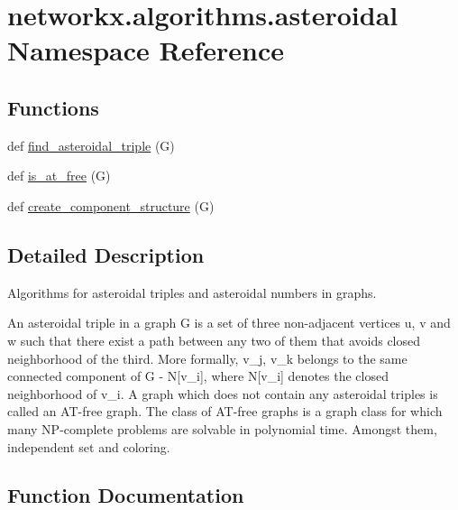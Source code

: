 \hypertarget{namespacenetworkx_1_1algorithms_1_1asteroidal}{}\section{networkx.\+algorithms.\+asteroidal Namespace Reference}
\label{namespacenetworkx_1_1algorithms_1_1asteroidal}
\subsection*{Functions}
\begin{DoxyCompactItemize}
\item 
def \hyperlink{namespacenetworkx_1_1algorithms_1_1asteroidal_a52ad59ee149f23832e47b4134b0a38c5}{find\+\_\+asteroidal\+\_\+triple} (G)
\item 
def \hyperlink{namespacenetworkx_1_1algorithms_1_1asteroidal_a23c0fabd6a68cfcba6aef2b8e2e07d95}{is\+\_\+at\+\_\+free} (G)
\item 
def \hyperlink{namespacenetworkx_1_1algorithms_1_1asteroidal_a4e1f3f5d46ec80df50d26739bff8cfed}{create\+\_\+component\+\_\+structure} (G)
\end{DoxyCompactItemize}


\subsection{Detailed Description}
\begin{DoxyVerb}Algorithms for asteroidal triples and asteroidal numbers in graphs.

An asteroidal triple in a graph G is a set of three non-adjacent vertices
u, v and w such that there exist a path between any two of them that avoids
closed neighborhood of the third. More formally, v_j, v_k belongs to the same
connected component of G - N[v_i], where N[v_i] denotes the closed neighborhood
of v_i. A graph which does not contain any asteroidal triples is called
an AT-free graph. The class of AT-free graphs is a graph class for which
many NP-complete problems are solvable in polynomial time. Amongst them,
independent set and coloring.
\end{DoxyVerb}
 

\subsection{Function Documentation}
\mbox{\label{namespacenetworkx_1_1algorithms_1_1asteroidal_a4e1f3f5d46ec80df50d26739bff8cfed}} 
